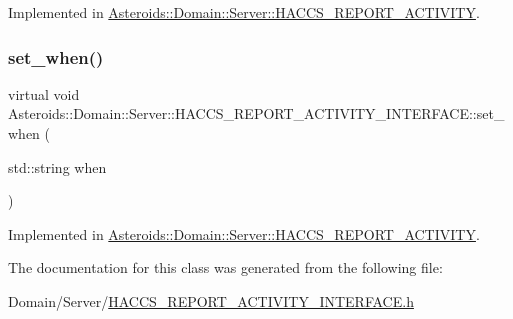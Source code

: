 Implemented in \hyperlink{classAsteroids_1_1Domain_1_1Server_1_1HACCS__REPORT__ACTIVITY_ac288905c22c264101f873e4aa46b05f8}{Asteroids\+::\+Domain\+::\+Server\+::\+H\+A\+C\+C\+S\+\_\+\+R\+E\+P\+O\+R\+T\+\_\+\+A\+C\+T\+I\+V\+I\+TY}.

\mbox{\label{classAsteroids_1_1Domain_1_1Server_1_1HACCS__REPORT__ACTIVITY__INTERFACE_a552de5536f119e9d5f9fc01b95f740bb}} 
\subsubsection{\texorpdfstring{set\+\_\+when()}{set\_when()}}
{\footnotesize\ttfamily virtual void Asteroids\+::\+Domain\+::\+Server\+::\+H\+A\+C\+C\+S\+\_\+\+R\+E\+P\+O\+R\+T\+\_\+\+A\+C\+T\+I\+V\+I\+T\+Y\+\_\+\+I\+N\+T\+E\+R\+F\+A\+C\+E\+::set\+\_\+when (\begin{DoxyParamCaption}\item[{std\+::string}]{when }\end{DoxyParamCaption})\hspace{0.3cm}{\ttfamily [pure virtual]}}



Implemented in \hyperlink{classAsteroids_1_1Domain_1_1Server_1_1HACCS__REPORT__ACTIVITY_ae4f559ef148e51112899477c853dc806}{Asteroids\+::\+Domain\+::\+Server\+::\+H\+A\+C\+C\+S\+\_\+\+R\+E\+P\+O\+R\+T\+\_\+\+A\+C\+T\+I\+V\+I\+TY}.



The documentation for this class was generated from the following file\+:\begin{DoxyCompactItemize}
\item 
Domain/\+Server/\hyperlink{HACCS__REPORT__ACTIVITY__INTERFACE_8h}{H\+A\+C\+C\+S\+\_\+\+R\+E\+P\+O\+R\+T\+\_\+\+A\+C\+T\+I\+V\+I\+T\+Y\+\_\+\+I\+N\+T\+E\+R\+F\+A\+C\+E.\+h}\end{DoxyCompactItemize}
